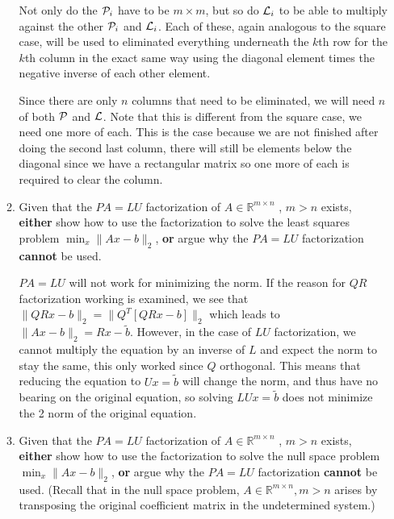 \documentclass{article}
\newcommand{\twonorm}[1]{\| #1 \|_2}
\begin{document}
\begin{enumerate}
\begin{enumerate}
        Not only do the $\mathcal{P}_i$ have to be $m \times m$, but so do $\mathcal{L}_i$ to be able to multiply against the other $\mathcal{P}_i$ and $\mathcal{L}_i$. Each of these, again analogous to the square case, will be used to eliminated everything underneath the $k$th row for the $k$th column in the exact same way using the diagonal element times the negative inverse of each other element.
        
        Since there are only $n$ columns that need to be eliminated, we will need $n$ of both $\mathcal{P}$ and $\mathcal{L}$. Note that this is different from the square case, we need one more of each. This is the case because we are not finished after doing the second last column, there will still be elements below the diagonal since we have a rectangular matrix so one more of each is required to clear the column.
      
      \item Given that the $PA = LU$ factorization of $A \in \mathbb{R}^{m \times n}$ , $m > n$ exists, \textbf{either} show how to use the factorization to solve the least squares problem $\min_x \twonorm{Ax - b}$, \textbf{or} argue why the $PA = LU$ factorization \textbf{cannot} be used.

     $PA = LU$ will not work for minimizing the norm. If the reason for $QR$ factorization working is examined, we see that $\twonorm{QRx - b} = \twonorm{Q^T[QRx-b]}$ which leads to $\twonorm{Ax-b} = {Rx-\tilde{b}}$. However, in the case of $LU$ factorization, we cannot multiply the equation by an inverse of $L$ and expect the norm to stay the same, this only worked since $Q$ orthogonal. This means that reducing the equation to $Ux = \tilde{b}$ will change the norm, and thus have no bearing on the original equation, so solving $LUx = \tilde{b}$ does not minimize the 2 norm of the original equation.
      
      \item Given that the $PA = LU$ factorization of $A \in \mathbb{R}^{m \times n}$ , $m > n$ exists, \textbf{either} show how to use the factorization to solve the null space problem $\min_x \twonorm{Ax - b}$, \textbf{or} argue why the $PA = LU$ factorization \textbf{cannot} be used. (Recall that in the null space problem, $A \in \mathbb{R}^{m \times n}, m > n$ arises by transposing the original coefficient matrix in the undetermined system.)


\end{enumerate}
\end{enumerate}
\end{document}
